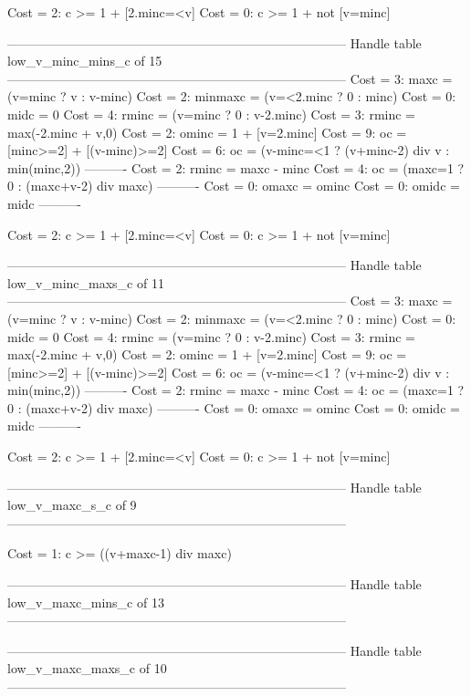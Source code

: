 Cost =  2:  c >= 1 + [2.minc=<v]
Cost =  0:  c >= 1 + not [v=minc]

--------------------------------------------------------------------------------
Handle table low_v_minc_mins_c of 15
--------------------------------------------------------------------------------
Cost =  3:  maxc    = (v=minc ? v : v-minc)
Cost =  2:  minmaxc = (v=<2.minc ? 0 : minc)
Cost =  0:  midc    = 0
Cost =  4:  rminc   = (v=minc ? 0 : v-2.minc)
Cost =  3:  rminc   = max(-2.minc + v,0)
Cost =  2:  ominc   = 1 + [v=2.minc]
Cost =  9:  oc      = [minc>=2] + [(v-minc)>=2]
Cost =  6:  oc      = (v-minc=<1 ? (v+minc-2) div v : min(minc,2))
----------
Cost =  2:  rminc   = maxc - minc
Cost =  4:  oc      = (maxc=1 ? 0 : (maxc+v-2) div maxc)
----------
Cost =  0:  omaxc   = ominc
Cost =  0:  omidc   = midc
----------

Cost =  2:  c >= 1 + [2.minc=<v]
Cost =  0:  c >= 1 + not [v=minc]

--------------------------------------------------------------------------------
Handle table low_v_minc_maxs_c of 11
--------------------------------------------------------------------------------
Cost =  3:  maxc    = (v=minc ? v : v-minc)
Cost =  2:  minmaxc = (v=<2.minc ? 0 : minc)
Cost =  0:  midc    = 0
Cost =  4:  rminc   = (v=minc ? 0 : v-2.minc)
Cost =  3:  rminc   = max(-2.minc + v,0)
Cost =  2:  ominc   = 1 + [v=2.minc]
Cost =  9:  oc      = [minc>=2] + [(v-minc)>=2]
Cost =  6:  oc      = (v-minc=<1 ? (v+minc-2) div v : min(minc,2))
----------
Cost =  2:  rminc   = maxc - minc
Cost =  4:  oc      = (maxc=1 ? 0 : (maxc+v-2) div maxc)
----------
Cost =  0:  omaxc   = ominc
Cost =  0:  omidc   = midc
----------

Cost =  2:  c >= 1 + [2.minc=<v]
Cost =  0:  c >= 1 + not [v=minc]

--------------------------------------------------------------------------------
Handle table low_v_maxc_s_c of 9
--------------------------------------------------------------------------------

Cost =  1:  c >= ((v+maxc-1) div maxc)

--------------------------------------------------------------------------------
Handle table low_v_maxc_mins_c of 13
--------------------------------------------------------------------------------


--------------------------------------------------------------------------------
Handle table low_v_maxc_maxs_c of 10
--------------------------------------------------------------------------------

